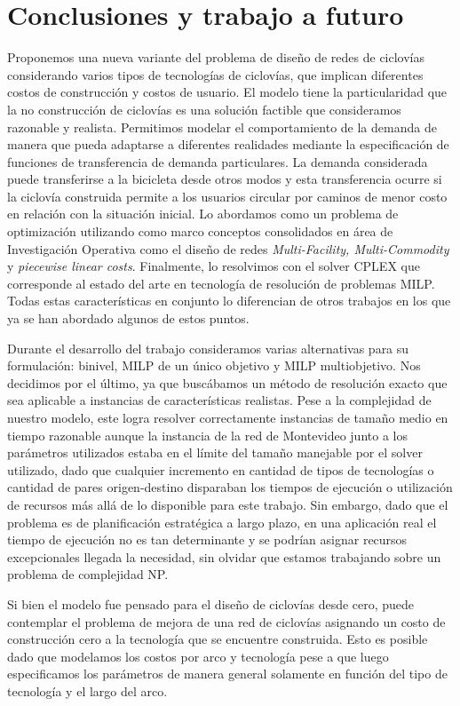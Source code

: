 \chapter{Conclusiones y trabajo a futuro}

Proponemos una nueva variante del problema de diseño de redes de ciclovías considerando varios tipos de tecnologías de ciclovías, que implican diferentes costos de construcción y costos de usuario. El modelo tiene la particularidad que la no construcción de ciclovías es una solución factible que consideramos razonable y realista. Permitimos modelar el comportamiento de la demanda de manera que pueda adaptarse a diferentes realidades mediante la especificación de funciones de transferencia de demanda particulares. La demanda considerada puede transferirse a la bicicleta desde otros modos y esta transferencia ocurre si la ciclovía construida permite a los usuarios circular por caminos de menor costo en relación con la situación inicial. Lo abordamos como un problema de optimización utilizando como marco conceptos consolidados en área de Investigación Operativa como el diseño de redes {\it Multi-Facility, Multi-Commodity} y {\it piecewise linear costs}. Finalmente, lo resolvimos con el solver CPLEX que corresponde al estado del arte en tecnología de resolución de problemas MILP. Todas estas características en conjunto lo diferencian de otros trabajos en los que ya se han abordado algunos de estos puntos.

Durante el desarrollo del trabajo consideramos varias alternativas para su formulación: binivel, MILP de un único objetivo y MILP multiobjetivo. Nos decidimos por el último, ya que buscábamos un método de resolución exacto que sea aplicable a instancias de características realistas. Pese a la complejidad de nuestro modelo, este logra resolver correctamente instancias de tamaño medio en tiempo razonable aunque la instancia de la red de Montevideo junto a los parámetros utilizados estaba en el límite del tamaño manejable por el solver utilizado, dado que cualquier incremento en cantidad de tipos de tecnologías o cantidad de pares origen-destino disparaban los tiempos de ejecución o utilización de recursos más allá de lo disponible para este trabajo. Sin embargo, dado que el problema es de planificación estratégica a largo plazo, en una aplicación real el tiempo de ejecución no es tan determinante y se podrían asignar recursos excepcionales llegada la necesidad, sin olvidar que estamos trabajando sobre un problema de complejidad NP.

Si bien el modelo fue pensado para el diseño de ciclovías desde cero, puede contemplar el problema de mejora de una red de ciclovías asignando un costo de construcción cero a la tecnología que se encuentre construida. Esto es posible dado que modelamos los costos por arco y tecnología pese a que luego especificamos los parámetros de manera general solamente en función del tipo de tecnología y el largo del arco.

